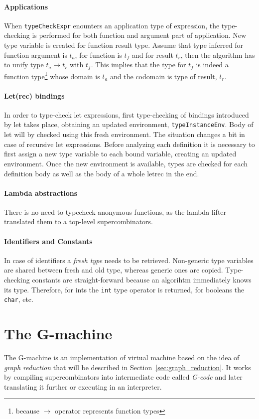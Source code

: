 \documentclass[12pt,a4paper]{report}
\begin{document}
\subsubsection{Applications}
When \texttt{typeCheckExpr} enounters an application type of expression, the
type-checking is performed for both function and argument part of application.
New type variable is created for function result type. Assume that type
inferred for function argument is $t_a$, for function is $t_f$ and for result
$t_r$, then the algorithm has to unify type $t_a \rightarrow
t_r$ with $t_f$. This implies that the type for $t_f$ is indeed a function
type\footnote{because $\rightarrow$ operator represents function types} whose
domain is $t_a$ and the codomain is type of result, $t_r$.

\subsubsection{Let(rec) bindings}
In order to type-check let expressions, first type-checking of
bindings introduced by let takes place, obtaining an updated
environment, \texttt{typeInstanceEnv}. Body of let will by checked
using this fresh environment. The situation changes a bit in case of recursive
let expressions. Before analyzing each definition it is necessary to
first assign a new type variable to each bound variable, creating an updated
environment. Once the new environment is available, types are checked for each
definition body as well as the body of a whole letrec in the end.

\subsubsection{Lambda abstractions}
There is no need to typecheck anonymous functions, as the lambda lifter
translated them to a top-level supercombinators.

\subsubsection{Identifiers and Constants}
In case of identifiers a \textit{fresh type} needs to be retrieved. Non-generic
type variables are shared between fresh and old type, whereas generic ones are
copied. Type-checking constants are straight-forward because an algorihtm
immediately knows its type. Therefore, for ints the \texttt{int} type operator
is returned, for booleans the \texttt{char}, etc.

\chapter{The G-machine}
The G-machine is an implementation of virtual machine based on the idea of
\textit{graph reduction} that will be described in
Section~\ref{sec:graph_reduction}. It works by compiling supercombinators into
intermediate code called \textit{G-code} and later translating it further or
executing in an interpreter.
\end{document}
